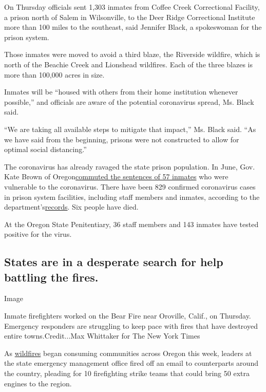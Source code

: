 On Thursday officials sent 1,303 inmates from Coffee Creek Correctional
Facility, a prison north of Salem in Wilsonville, to the Deer Ridge
Correctional Institute more than 100 miles to the southeast, said
Jennifer Black, a spokeswoman for the prison system.

Those inmates were moved to avoid a third blaze, the Riverside wildfire,
which is north of the Beachie Creek and Lionshead wildfires. Each of the
three blazes is more than 100,000 acres in size.

Inmates will be ``housed with others from their home institution
whenever possible,'' and officials are aware of the potential
coronavirus spread, Ms. Black said.

``We are taking all available steps to mitigate that impact,'' Ms. Black
said. ``As we have said from the beginning, prisons were not constructed
to allow for optimal social distancing.''

The coronavirus has already ravaged the state prison population. In
June, Gov. Kate Brown of
Oregon\href{https://www.oregon.gov/newsroom/Pages/NewsDetail.aspx?newsid=36856}{commuted
the sentences of 57 inmates} who were vulnerable to the coronavirus.
There have been 829 confirmed coronavirus cases in prison system
facilities, including staff members and inmates, according to the
department's\href{https://www.oregon.gov/doc/covid19/Pages/covid19-tracking.aspx}{records}.
Six people have died.

At the Oregon State Penitentiary, 36 staff members and 143 inmates have
tested positive for the virus.

\hypertarget{states-are-in-a-desperate-search-for-help-battling-the-fires}{%
\subsection{States are in a desperate search for help battling the
fires.}\label{states-are-in-a-desperate-search-for-help-battling-the-fires}}

Image

Inmate firefighters worked on the Bear Fire near Oroville, Calif., on
Thursday. Emergency responders are struggling to keep pace with fires
that have destroyed entire towns.Credit...Max Whittaker for The New York
Times

As
\href{https://www.nytimes3xbfgragh.onion/article/wildfires-photos-california-oregon-washington-state.html}{wildfires}
began consuming communities across Oregon this week, leaders at the
state emergency management office fired off an email to counterparts
around the country, pleading for 10 firefighting strike teams that could
bring 50 extra engines to the region.

